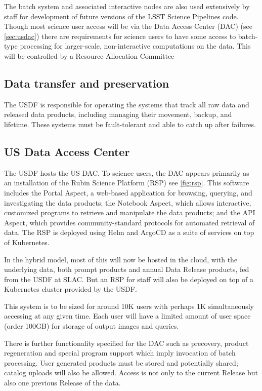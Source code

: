 The batch system and associated interactive nodes are also used extensively by staff for development of future versions of the LSST Science Pipelines code.\cite{2019ASPC..523..521B}
Though most science user access will be via the Data Access Center (DAC) (see \autoref{sec:usdac})
there are requirements for science users to have some access to batch-type processing for larger-scale, non-interactive computations on the data.\cite{DMTN-223}
This will be controlled by a Resource Allocation Committee

\subsection{Data transfer and preservation} \label{req:dbb}
The USDF is responsible for operating the systems that track all raw data and released data products, including managing their movement, backup, and lifetime.
These systems must be fault-tolerant and able to catch up after failures.

\subsection{US Data Access Center}\label{sec:usdac}
The USDF hosts the US DAC.
To science users, the DAC appears primarily as an installation of the Rubin Science Platform (RSP)\cite{LDM-542} see \autoref{fig:rsp}.
This software includes the Portal Aspect, a web-based application for browsing, querying, and investigating the data products; the Notebook Aspect, which allows interactive, customized programs to retrieve and manipulate the data products; and the API Aspect, which provides community-standard protocols for automated retrieval of data.
The RSP is deployed using Helm and ArgoCD as a suite of services on top of Kubernetes.

In the hybrid model, most of this will now be hosted in the cloud, with the underlying data, both prompt products and annual Data Release products, fed from the USDF at SLAC.
But an RSP for staff will also be deployed on top of a Kubernetes cluster provided by the USDF.

This system is to be sized for around 10K users with perhaps 1K simultaneously accessing at any given time.
Each user will have a limited amount of user space (order 100GB) for storage of output images and queries.

There is further functionality specified for the DAC such as precovery, product regeneration and special program support which imply invocation
of batch processing.
User generated products must be stored and potentially shared; catalog uploads will also be allowed.
Access is not only to the current Release but also one previous Release of the data.
